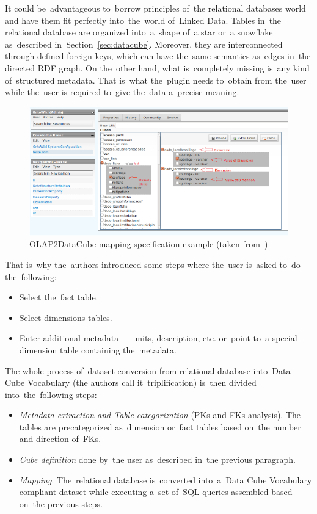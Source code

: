 It could be~advantageous to~borrow principles of~the relational databases world and have them
fit perfectly into~the~world of~Linked Data. Tables in~the relational database 
are organized into~a~shape of~a star or~a snowflake as~described in~Section~\ref{sec:datacube}.
Moreover, they are interconnected through defined foreign keys,
which can have the~same semantics as~edges in~the directed RDF graph.
On the~other hand, what is~completely missing is~any kind of~structured
metadata. That is~what the~plugin needs to~obtain from the~user while the~user
is required to~give the~data a~precise meaning.

\begin{figure}
	\centering
	\includegraphics[width=140mm]{img/olapimport.png}
	\caption{OLAP2DataCube mapping specification example (taken from~\cite{olap2dc-paper})}
	\label{fig:olap2dc-screen}
\end{figure}


That is~why the~authors introduced some steps where the~user is~asked to~do the~following:
\begin{itemize}
  \item Select the~fact table.
  \item Select dimensions tables.
  \item Enter additional metadata --- units, description, etc. or~point to~a 
  special dimension table containing the~metadata.
\end{itemize}

The whole process of~dataset conversion from relational database into~Data Cube Vocabulary
(the authors call it~triplification) is~then divided into~the~following steps:
\begin{itemize}
  \item \emph{Metadata extraction and Table categorization} (PKs and FKs analysis). The~  tables are precategorized as~dimension or~fact tables based on~the number and 
  direction of~FKs.
  \item \emph{Cube definition} done by~the user as~described in~the previous paragraph.
  \item \emph{Mapping}. The~relational database is~converted into~a~Data Cube 
  Vocabulary compliant dataset while executing a~set of~SQL queries assembled 
  based on~the previous steps.
\end{itemize}

